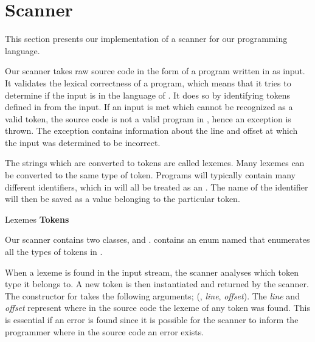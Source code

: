 \section{Scanner}
This section presents our implementation of a scanner for our programming language.

Our scanner takes raw source code in the form of a program written in \productname{} as input. It validates the lexical correctness of a \productname{} program, which means that it tries to determine if the input is in the language of \productname{}. It does so by identifying tokens defined in \productname{} from the input. If an input is met which cannot be recognized as a valid token, the source code is not a valid program in \productname{}, hence an exception is thrown. The exception contains information about the line and offset at which the input was determined to be incorrect.

The strings which are converted to tokens are called lexemes. Many lexemes can be converted to the same type of token. Programs will typically contain many different identifiers, which in \productname{} will all be treated as an . The name of the identifier will then be saved as a value belonging to the particular token.

                 {						}
       {Lexemes	}{\textbf{Tokens}		}{
\tabrow{$[$    	}{ LBRACKET				}
\tabrow{$]$		}{ RBRACKET 			}
}

Our scanner contains two classes,  and .  contains an enum named  that enumerates all the types of tokens in \productname{}. 

When a lexeme is found in the input stream, the scanner analyses which token type it belongs to. A new token is then instantiated and returned by the scanner. The constructor for  takes the following arguments; (, \textit{line}, \textit{offset}). The \textit{line} and \textit{offset} represent where in the source code the lexeme of any token was found. This is essential if an error is found since it is possible for the scanner to inform the programmer where in the source code an error exists.

